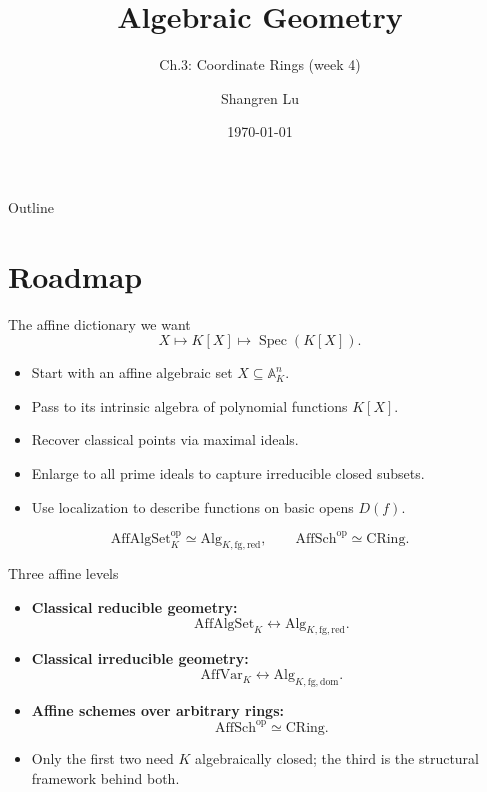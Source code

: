 \documentclass[10pt, aspectratio=169]{beamer}
\title{Algebraic Geometry}
\subtitle{Ch.3: Coordinate Rings (week 4)}
\author{Shangren Lu}
\institute[UniMelb]{University of Melbourne}
\date{\today}
\DeclareMathOperator{\Spec}{Spec}
\newcommand{\A}{\mathbb{A}}
\newcommand{\AffAlgSetK}{\mathrm{AffAlgSet}_K}
\newcommand{\AffVarK}{\mathrm{AffVar}_K}
\newcommand{\AlgKfgred}{\mathrm{Alg}_{K,\mathrm{fg},\mathrm{red}}}
\newcommand{\AlgKfgdom}{\mathrm{Alg}_{K,\mathrm{fg},\mathrm{dom}}}
\newcommand{\AffSch}{\mathrm{AffSch}}
\newcommand{\CRing}{\mathrm{CRing}}
\begin{document}
\begin{frame}
    \titlepage
\end{frame}

\begin{frame}{Outline}
    \tableofcontents
\end{frame}

\section{Roadmap}

\begin{frame}{The affine dictionary we want}
    \[
    X \longmapsto K[X] \longmapsto \Spec(K[X]).
    \]
    \begin{itemize}
        \item Start with an affine algebraic set $X \subseteq \A_K^n$.
        \item Pass to its intrinsic algebra of polynomial functions $K[X]$.
        \item Recover classical points via maximal ideals.
        \item Enlarge to all prime ideals to capture irreducible closed subsets.
        \item Use localization to describe functions on basic opens $D(f)$.
    \end{itemize}
    \[
    \AffAlgSetK^{\mathrm{op}} \simeq \AlgKfgred,
    \qquad
    \AffSch^{\mathrm{op}} \simeq \CRing.
    \]
\end{frame}

\begin{frame}{Three affine levels}
    \begin{itemize}
        \item \textbf{Classical reducible geometry:}
        \[
        \AffAlgSetK \leftrightarrow \AlgKfgred.
        \]
        \item \textbf{Classical irreducible geometry:}
        \[
        \AffVarK \leftrightarrow \AlgKfgdom.
        \]
        \item \textbf{Affine schemes over arbitrary rings:}
        \[
        \AffSch^{\mathrm{op}} \simeq \CRing.
        \]
        \item Only the first two need $K$ algebraically closed; the third is the structural framework behind both.
    \end{itemize}
\end{frame}
\end{document}
